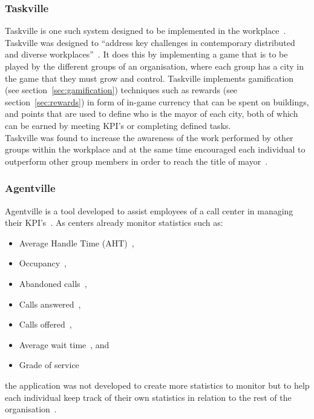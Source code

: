 \documentclass[a4paper,12pt]{article}
\begin{document}
\subsubsection{Taskville}\label{sec:taskville}
Taskville is one such system designed to be implemented in the workplace~\citep{taskville}. Taskville was designed to ``address key challenges in contemporary distributed and diverse workplaces''~\citep[p.~4]{taskville}. 
It does this by implementing a game that is to be played by the different groups of an organisation, where each group  has a city in the game that they must grow and control. Taskville implements gamification (see section~\ref{sec:gamification}) techniques such as rewards (see section~\ref{sec:rewards}) in form of in-game currency that can be spent on buildings, and points that are used to define who is the mayor of each city, both of which can be earned by meeting KPI's or completing defined tasks.\\ Taskville was found to increase the awareness of the work performed by other groups within the workplace and at the same time encouraged each individual to outperform other group members in order to reach the title of mayor~\citep{taskville}.

\subsubsection{Agentville}\label{sec:agentville}
Agentville is a tool developed to assist employees of a call center in managing their KPI's~\citep{production-environments}. As centers already monitor statistics such as:
\begin{itemize}
	\item{Average Handle Time (AHT)~\citep{production-environments},}
	\item{Occupancy~\citep{call-center},}
	\item{Abandoned calls~\citep{call-center},}
	\item{Calls answered~\citep{call-center},}
	\item{Calls offered~\citep{call-center},}
	\item{Average wait time~\citep{call-center}, and}
	\item{Grade of service~\citep{call-center}}
\end{itemize}
the application was not developed to create more statistics to monitor but to help each individual keep track of their own statistics in relation to the rest of the organisation~\citep{production-environments}.
\end{document}
